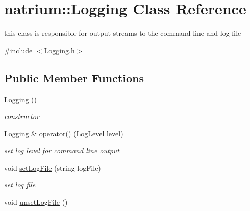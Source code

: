 \hypertarget{classnatrium_1_1Logging}{
\section{natrium::Logging Class Reference}
\label{classnatrium_1_1Logging}
}


this class is responsible for output streams to the command line and log file  


{\ttfamily \#include $<$Logging.h$>$}\subsection*{Public Member Functions}
\begin{DoxyCompactItemize}
\item 
\hypertarget{classnatrium_1_1Logging_a255455c6e8a6c109a8e7e905bdd57ea3}{
\hyperlink{classnatrium_1_1Logging_a255455c6e8a6c109a8e7e905bdd57ea3}{Logging} ()}
\label{classnatrium_1_1Logging_a255455c6e8a6c109a8e7e905bdd57ea3}

\begin{DoxyCompactList}\small\item\em constructor \item\end{DoxyCompactList}\item 
\hypertarget{classnatrium_1_1Logging_a2bfeafec90e8b3fdceddc2866fda6e3d}{
\hyperlink{classnatrium_1_1Logging}{Logging} \& \hyperlink{classnatrium_1_1Logging_a2bfeafec90e8b3fdceddc2866fda6e3d}{operator()} (LogLevel level)}
\label{classnatrium_1_1Logging_a2bfeafec90e8b3fdceddc2866fda6e3d}

\begin{DoxyCompactList}\small\item\em set log level for command line output \item\end{DoxyCompactList}\item 
\hypertarget{classnatrium_1_1Logging_a6dc3bdfa386b24a031578f9293a24403}{
void \hyperlink{classnatrium_1_1Logging_a6dc3bdfa386b24a031578f9293a24403}{setLogFile} (string logFile)}
\label{classnatrium_1_1Logging_a6dc3bdfa386b24a031578f9293a24403}

\begin{DoxyCompactList}\small\item\em set log file \item\end{DoxyCompactList}\item 
\hypertarget{classnatrium_1_1Logging_a23b437c7ee426af555a42409ca3aa566}{
void \hyperlink{classnatrium_1_1Logging_a23b437c7ee426af555a42409ca3aa566}{unsetLogFile} ()}
\label{classnatrium_1_1Logging_a23b437c7ee426af555a42409ca3aa566}


\end{DoxyCompactItemize}
